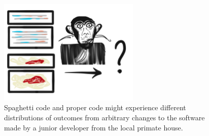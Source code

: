 \begin{figure}
  \includegraphics[width=0.6\textwidth]{img/spaghetti_monkey}
  \captionsetup{singlelinecheck=off,justification=raggedright}
  \caption{Spaghetti code and proper code might experience different distributions of outcomes from arbitrary changes to the software made by a junior developer from the local primate house.}
\end{figure}